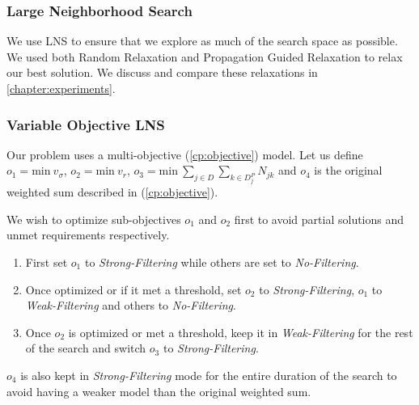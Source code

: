 \documentclass[../../thesis.tex]{subfiles}
\begin{document}
\subsubsection{Large Neighborhood Search}

We use LNS to ensure that we explore as much of the search space as possible. 
We used both Random Relaxation and Propagation Guided Relaxation \cite{Propagation:LNS} to relax 
our best solution. We discuss and compare these relaxations in \autoref{chapter:experiments}.


\subsubsection{Variable Objective LNS}
\label{cp:volns}

Our problem uses a multi-objective (\ref{cp:objective}) model. 
Let us define $o_1 = \text{min} \ v_{\sigma}$, $o_2 = {\text{min} \ v_r}$, $o_3 = {\text{min} \ \sum_{j \in D} \sum_{k \in D^P_j} N_{jk}}$
and $o_4$ is the original weighted sum described in (\ref{cp:objective}).


We wish to optimize sub-objectives $o_1$ and $o_2$ first to avoid partial solutions and unmet requirements respectively. 

\begin{enumerate}
  \item First set $o_1$ to \emph{Strong-Filtering} while others are set to \emph{No-Filtering}.
  \item Once optimized or if it met a threshold, set $o_2$ to \emph{Strong-Filtering}, $o_1$ to \emph{Weak-Filtering} and others to \emph{No-Filtering}.
  \item Once $o_2$ is optimized or met a threshold, keep it in \emph{Weak-Filtering} for the rest of the search and switch $o_3$ to \emph{Strong-Filtering}.
\end{enumerate}

$o_4$ is also kept in \emph{Strong-Filtering} mode for the entire duration of the search to avoid having a weaker model than the original weighted sum.
\end{document}
